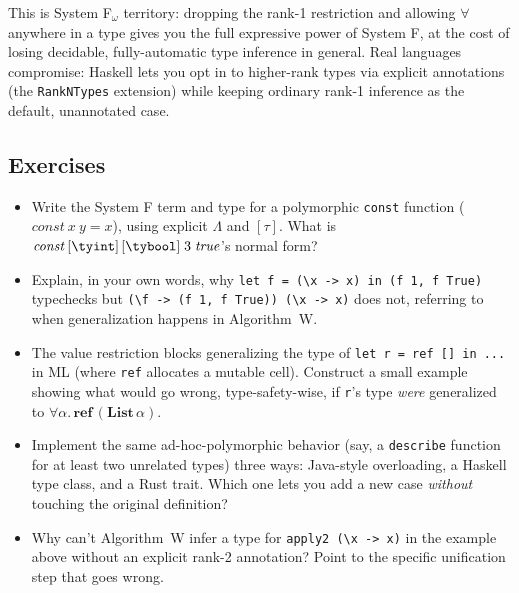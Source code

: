 This is System F$_\omega$ territory: dropping the rank-1 restriction and allowing $\forall$ anywhere in a type gives you the full expressive power of System F, at the cost of losing decidable, fully-automatic type inference in general. Real languages compromise: Haskell lets you opt in to higher-rank types via explicit annotations (the \texttt{RankNTypes} extension) while keeping ordinary rank-1 inference as the default, unannotated case.

\subsection{Exercises}
\begin{itemize}
  \item Write the System F term and type for a polymorphic \lstinline|const| function ($\mathit{const}\ x\ y = x$), using explicit $\Lambda$ and $[\tau]$. What is $\mathit{const}\,[\tyint]\,[\tybool]\;3\;\mathit{true}$'s normal form?
  \item Explain, in your own words, why \lstinline|let f = (\x -> x) in (f 1, f True)| typechecks but \lstinline|(\f -> (f 1, f True)) (\x -> x)| does not, referring to when generalization happens in Algorithm~W.
  \item The value restriction blocks generalizing the type of \lstinline|let r = ref [] in ...| in ML (where \lstinline|ref| allocates a mutable cell). Construct a small example showing what would go wrong, type-safety-wise, if \lstinline|r|'s type \emph{were} generalized to $\forall\alpha.\,\mathbf{ref}\,(\mathbf{List}\,\alpha)$.
  \item Implement the same ad-hoc-polymorphic behavior (say, a \lstinline|describe| function for at least two unrelated types) three ways: Java-style overloading, a Haskell type class, and a Rust trait. Which one lets you add a new case \emph{without} touching the original definition?
  \item Why can't Algorithm~W infer a type for \lstinline|apply2 (\x -> x)| in the example above without an explicit rank-2 annotation? Point to the specific unification step that goes wrong.
\end{itemize}
